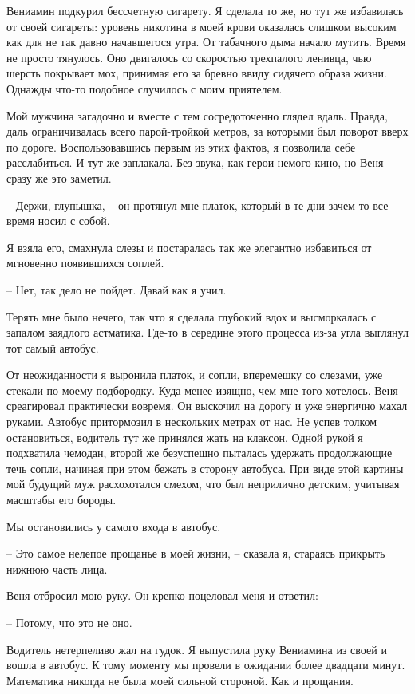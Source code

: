 \documentclass[
]{book}
\begin{document}
Вениамин подкурил бессчетную сигарету. Я сделала то же, но тут же избавилась от своей сигареты: уровень никотина в моей крови оказалась слишком высоким как для не так давно начавшегося утра. От табачного дыма начало мутить. Время не просто тянулось. Оно двигалось со скоростью трехпалого ленивца, чью шерсть покрывает мох, принимая его за бревно ввиду сидячего образа жизни. Однажды что-то подобное случилось с моим приятелем.

Мой мужчина загадочно и вместе с тем сосредоточенно глядел вдаль. Правда, даль ограничивалась всего парой-тройкой метров, за которыми был поворот вверх по дороге. Воспользовавшись первым из этих фактов, я позволила себе расслабиться. И тут же заплакала. Без звука, как герои немого кино, но Веня сразу же это заметил.

-- Держи, глупышка, -- он протянул мне платок, который в те дни зачем-то все время носил с собой.

Я взяла его, смахнула слезы и постаралась так же элегантно избавиться от мгновенно появившихся соплей.

-- Нет, так дело не пойдет. Давай как я учил.

Терять мне было нечего, так что я сделала глубокий вдох и высморкалась с запалом заядлого астматика. Где-то в середине этого процесса из-за угла выглянул тот самый автобус.

От неожиданности я выронила платок, и сопли, вперемешку со слезами, уже стекали по моему подбородку. Куда менее изящно, чем мне того хотелось. Веня среагировал практически вовремя. Он выскочил на дорогу и уже энергично махал руками. Автобус притормозил в нескольких метрах от нас. Не успев толком остановиться, водитель тут же принялся жать на клаксон. Одной рукой я подхватила чемодан, второй же безуспешно пыталась удержать продолжающие течь сопли, начиная при этом бежать в сторону автобуса. При виде этой картины мой будущий муж расхохотался смехом, что был неприлично детским, учитывая масштабы его бороды.

Мы остановились у самого входа в автобус.

-- Это самое нелепое прощанье в моей жизни, -- сказала я, стараясь прикрыть нижнюю часть лица.

Веня отбросил мою руку. Он крепко поцеловал меня и ответил:

-- Потому, что это не оно.

Водитель нетерпеливо жал на гудок. Я выпустила руку Вениамина из своей и вошла в автобус. К тому моменту мы провели в ожидании более двадцати минут. Математика никогда не была моей сильной стороной. Как и прощания.
\end{document}
